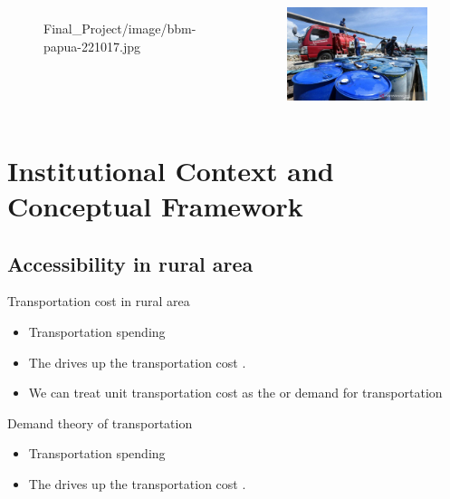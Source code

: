\documentclass[
11pt,notheorems,compress,hyperref={pdfauthor=Maghfira Ramadhani}
]{beamer}
\begin{document}
\begin{frame}
\begin{columns}[T,onlytextwidth]
\begin{figure}[t]
        {Final_Project/image/bbm-papua-221017.jpg}
        \end{figure}
    \begin{figure}[t]
        \includegraphics[scale=0.21]
        {Final_Project/image/bbm-satu-harga_1.jpg}
        \end{figure}
\end{columns}
\end{frame}

\section{Institutional Context and Conceptual Framework}
\subsection{Accessibility in rural area}
\begin{frame}
\begin{block}{Transportation cost in rural area}
\begin{itemize}
    \item Transportation spending  \citep{sambodo_2019}
    \item The  drives up the transportation cost \citep{sandee_2016}.
    \item We can treat unit transportation cost as the  or demand for transportation
\end{itemize}
\end{block}
\begin{block}{Demand theory of transportation}
\begin{itemize}
    \item Transportation spending  \citep{sambodo_2019}
    \item The  drives up the transportation cost \citep{sandee_2016}.
\end{itemize}
\end{block}
\end{frame}
\end{document}
